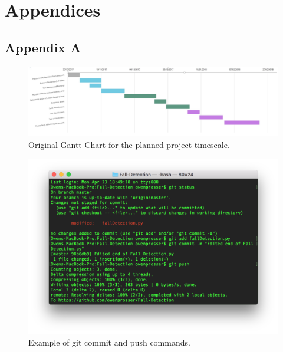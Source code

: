 \documentclass[11pt,a4paper]{report}
\begin{document}
\appendix
\section{Appendices}
\subsection{Appendix A}

\begin{figure}[H]
 \centering
 \includegraphics[scale = 0.33]{Original_gantt_chart.png}
 \caption{Original Gantt Chart for the planned project timescale.}
 \label{fig:OriginalGantt}
\end{figure}

\begin{figure}[H]
 \centering
 \includegraphics[scale = 0.55]{gitpush.png}
 \caption{Example of git commit and push commands.}
 \label{fig:GitCommitPush}
\end{figure}
\end{document}
